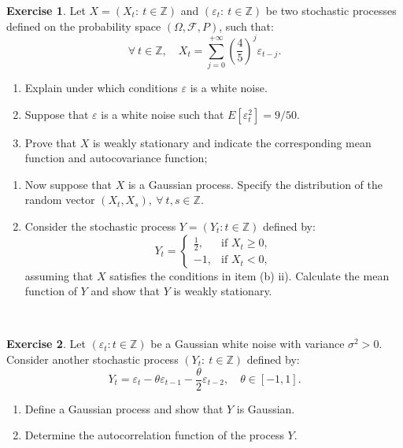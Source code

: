 \documentclass[
  11pt,
  a4paper,
]{book}
\theoremstyle{definition}
\theoremstyle{definition}
\theoremstyle{definition}
\newtheorem{exercise}{Exercise}[chapter]
\theoremstyle{definition}
\theoremstyle{remark}
\begin{document}
\begin{exercise}

Let \(X = (X_t: ~t \in \mathbb{Z})\) and \((\varepsilon_t: ~t \in \mathbb{Z})\) be two stochastic processes defined on the probability space \((\Omega, \mathcal{F}, P)\), such that:
\[
\forall ~t \in \mathbb{Z}, \quad X_t = \sum\limits_{j=0}^{+\infty} \left( \frac{4}{5} \right)^j \varepsilon_{t-j}.
\]

\begin{enumerate}
\def\labelenumi{(\alph{enumi})}
\item
  Explain under which conditions \(\varepsilon\) is a white noise.
\item
  Suppose that \(\varepsilon\) is a white noise such that \(E[\varepsilon_t^2] = 9/50\).
\item
  Prove that \(X\) is weakly stationary and indicate the corresponding mean function and autocovariance function;
\end{enumerate}

\begin{enumerate}
\def\labelenumi{(\roman{enumi})}
\setcounter{enumi}{1}
\item
  Now suppose that \(X\) is a Gaussian process. Specify the distribution of the random vector \((X_t, X_s), ~ \forall ~ t, s \in \mathbb{Z}\).
\item
  Consider the stochastic process \(Y = (Y_t: t \in \mathbb{Z})\) defined by:
  \[
  Y_t = 
  \begin{cases}
  \frac{1}{2}, & \text{if } X_t \geq 0, \\
  -1, & \text{if } X_t < 0,
  \end{cases}
  \]
  assuming that \(X\) satisfies the conditions in item (b) ii). Calculate the mean function of \(Y\) and show that \(Y\) is weakly stationary.
\end{enumerate}

\end{exercise}

\(\,\)

\begin{exercise}

Let \((\varepsilon_t: t \in \mathbb{Z})\) be a Gaussian white noise with variance \(\sigma^2 > 0\). Consider another stochastic process \((Y_t: ~t \in \mathbb{Z})\) defined by:
\[
Y_t = \varepsilon_t - \theta \varepsilon_{t-1} - \frac{\theta}{2} \varepsilon_{t-2}, \quad \theta \in [-1,1].
\]

\begin{enumerate}
\def\labelenumi{(\alph{enumi})}
\item
  Define a Gaussian process and show that \(Y\) is Gaussian.
\item
  Determine the autocorrelation function of the process \(Y\).
\end{enumerate}

\end{exercise}
\end{document}
